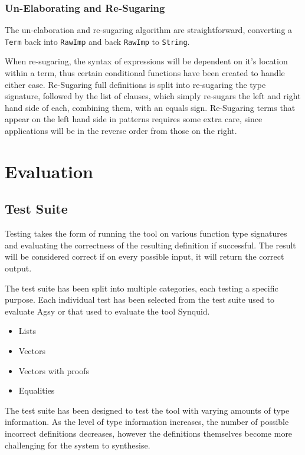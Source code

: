 \documentclass[a4paper]{article}
\begin{document}
\subsubsection{Un-Elaborating and Re-Sugaring}

The un-elaboration and re-sugaring algorithm are straightforward,
converting a \texttt{Term} back into \texttt{RawImp} and back \texttt{RawImp} to \texttt{String}.

When re-sugaring, the syntax of expressions will be dependent on it's location within a term,
thus certain conditional functions have been created to handle either case.
Re-Sugaring full definitions is split into re-sugaring the type
signature, followed by the list of clauses, which simply re-sugars the
left and right hand side of each, combining them, with an equals sign.
Re-Sugaring terms that appear on the left hand side in patterns
requires some extra care, since applications will be in the reverse
order from those on the right. 



\section{Evaluation}
\label{sec:org2fc5750}

\subsection{Test Suite}

Testing takes the form of running the tool on various
function type signatures and evaluating the correctness
of the resulting definition if successful. The result
will be considered correct if on every possible input, it
will return the correct output. 

The test suite has been split into multiple categories, 
each testing a specific purpose. Each individual test 
has been selected from the test suite used to evaluate 
Agsy or that used to evaluate the tool Synquid.


\begin{itemize}
\item Lists
\item Vectors
\item Vectors with proofs
\item Equalities
\end{itemize}

The test suite has been designed to test the tool with varying
amounts of type information. As the level of type information
increases, the number of possible incorrect definitions decreases,
however the definitions themselves become more challenging for the
system to synthesise.
\end{document}
